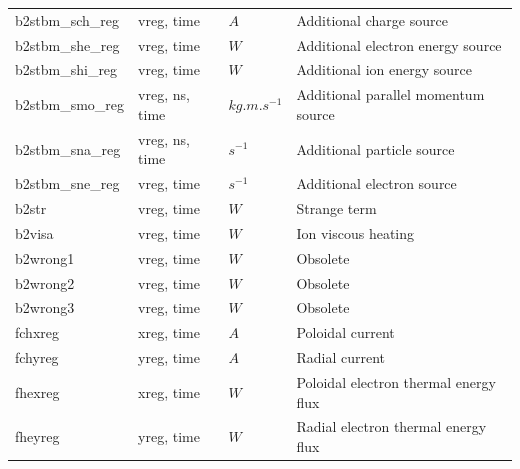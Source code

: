 \documentclass[a4paper,10pt]{report}
\begin{document}
\begin{center}
\begin{longtable}{|l|l|l|l|}
b2stbm\_sch\_reg \index{b2stbm\_sch\_reg}\index{b2tallies.nc, b2stbm\_sch\_reg}  & vreg, time     & $A$           & Additional charge source \\
b2stbm\_she\_reg \index{b2stbm\_she\_reg}\index{b2tallies.nc, b2stbm\_she\_reg}  & vreg, time     & $W$           & Additional electron energy source \\
b2stbm\_shi\_reg \index{b2stbm\_shi\_reg}\index{b2tallies.nc, b2stbm\_shi\_reg}  & vreg, time     & $W$           & Additional ion energy source \\
b2stbm\_smo\_reg \index{b2stbm\_smo\_reg}\index{b2tallies.nc, b2stbm\_smo\_reg}  & vreg, ns, time & $kg.m.s^{-1}$ & Additional parallel momentum source \\
b2stbm\_sna\_reg \index{b2stbm\_sna\_reg}\index{b2tallies.nc, b2stbm\_sna\_reg}  & vreg, ns, time & $s^{-1}$      & Additional particle source \\
b2stbm\_sne\_reg \index{b2stbm\_sne\_reg}\index{b2tallies.nc, b2stbm\_sne\_reg}  & vreg, time     & $s^{-1}$      & Additional electron source \\
b2str \index{b2str}\index{b2tallies.nc, b2str}                                   & vreg, time     & $W$           & Strange term \\
b2visa \index{b2visa}\index{b2tallies.nc, b2visa}                                & vreg, time     & $W$           & Ion viscous heating \\
b2wrong1 \index{b2wrong1}\index{b2tallies.nc, b2wrong1}                          & vreg, time     & $W$           & Obsolete \\
b2wrong2 \index{b2wrong2}\index{b2tallies.nc, b2wrong2}                          & vreg, time     & $W$           & Obsolete \\
b2wrong3 \index{b2wrong3}\index{b2tallies.nc, b2wrong3}                          & vreg, time     & $W$           & Obsolete \\
fchxreg \index{fchxreg}\index{b2tallies.nc, fchxreg}                             & xreg, time     & $A$           & Poloidal current \\
fchyreg \index{fchyreg}\index{b2tallies.nc, fchyreg}                             & yreg, time     & $A$           & Radial current \\
fhexreg \index{fhexreg}\index{b2tallies.nc, fhexreg}                             & xreg, time     & $W$           & Poloidal electron thermal energy flux \\
fheyreg \index{fheyreg}\index{b2tallies.nc, fheyreg}                             & yreg, time     & $W$           & Radial electron thermal energy flux \\

\end{longtable}
\end{center}
\end{document}

